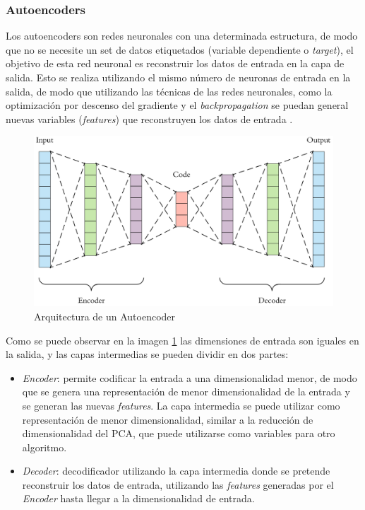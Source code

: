 \subsubsection{Autoencoders}

Los autoencoders son redes neuronales con una determinada estructura, de modo que no se necesite un set de datos etiquetados (variable dependiente o \textit{target}), el objetivo de esta red neuronal es reconstruir los datos de entrada en la capa de salida. Esto se realiza utilizando el mismo número de neuronas de entrada en la salida, de modo que utilizando las técnicas de las redes neuronales, como la optimización por descenso del gradiente y el \textit{backpropagation} se puedan general nuevas variables (\textit{features}) que reconstruyen los datos de entrada \cite{ng2011sparse}.

\begin{figure}[H]
    \centering
    \includegraphics[width=12cm]{figs/autoencoder.png}
    \caption{Arquitectura de un Autoencoder}
    \label{fig:autoencoder}
\end{figure}

Como se puede observar en la imagen \ref{fig:autoencoder} las dimensiones de entrada son iguales en la salida, y las capas intermedias se pueden dividir en dos partes:

\begin{itemize}
    \item \textit{Encoder}: permite codificar la entrada a una dimensionalidad menor, de modo que se genera una representación de menor dimensionalidad de la entrada y se generan las nuevas \textit{features}. La capa intermedia se puede utilizar como representación de menor dimensionalidad, similar a la reducción de dimensionalidad del PCA, que puede utilizarse como variables para otro algoritmo.
    \item \textit{Decoder}: decodificador utilizando la capa intermedia donde se pretende reconstruir los datos de entrada, utilizando las \textit{features} generadas por el \textit{Encoder} hasta llegar a la dimensionalidad de entrada.
\end{itemize}

